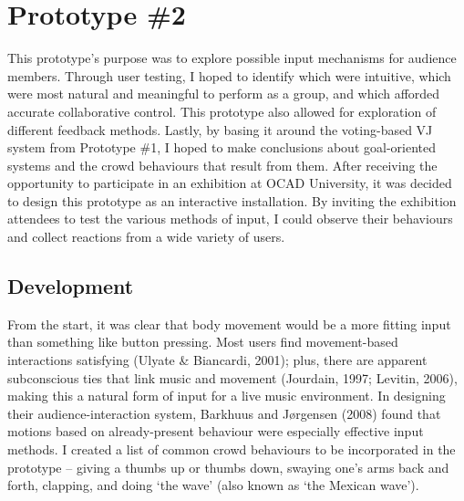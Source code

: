 

\section{Prototype \#2}

This prototype's purpose was to explore possible input mechanisms for audience members. Through user testing, I hoped to identify which were intuitive, which were most natural and meaningful to perform as a group, and which afforded accurate collaborative control.   This prototype also allowed for exploration of different feedback methods. Lastly, by basing it around the voting-based VJ system from Prototype \#1, I hoped to make conclusions about goal-oriented systems and the crowd behaviours that result from them. After receiving the opportunity to participate in an exhibition at OCAD University, it was decided to design this prototype as an interactive installation. By inviting the exhibition attendees to test the various methods of input, I could observe their behaviours and collect reactions from a wide variety of users.


\subsection{Development}

From the start, it was clear that body movement would be a more fitting input than something like button pressing. Most users find movement-based interactions satisfying (Ulyate \& Biancardi, 2001); plus, there are apparent subconscious ties that link music and movement (Jourdain, 1997; Levitin, 2006), making this a natural form of input for a live music environment. In designing their audience-interaction system, Barkhuus and J{\o}rgensen (2008) found that motions based on already-present behaviour were especially effective input methods. I created a list of common crowd behaviours to be incorporated in the prototype -- giving a thumbs up or thumbs down, swaying one's arms back and forth, clapping, and doing `the wave' (also known as `the Mexican wave').

